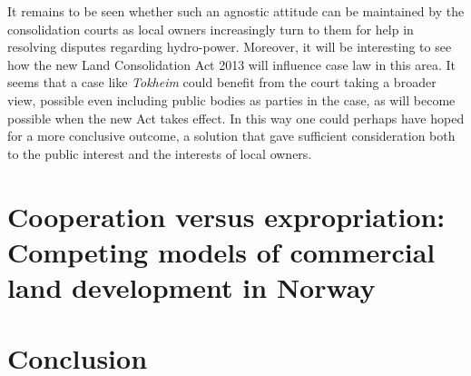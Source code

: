 It remains to be seen whether such an agnostic attitude can be maintained by the consolidation courts as local owners increasingly turn to them for help in resolving disputes regarding hydro-power. Moreover, it will be interesting to see how the new Land Consolidation Act 2013 will influence case law in this area. It seems that a case like \emph{Tokheim} could benefit from the court taking a broader view, possible even including public bodies as parties in the case, as will become possible when the new Act takes effect. In this way one could perhaps have hoped for a more conclusive outcome, a solution that gave sufficient consideration both to the public interest and the interests of local owners.

\section{Cooperation versus expropriation: Competing models of commercial land development in Norway}\label{sec:5}

\section{Conclusion}\label{sec:6}

